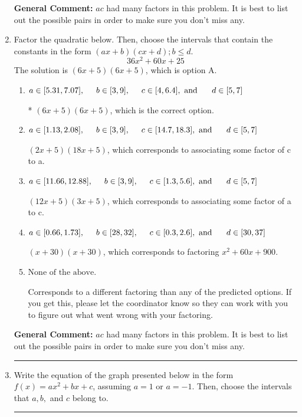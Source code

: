 \documentclass{extbook}[14pt]
\newcommand{\litem}[1]{\item #1

\rule{\textwidth}{0.4pt}}
\begin{document}
\begin{enumerate}
{\textbf{General Comment:} $ac$ had many factors in this problem. It is best to list out the possible pairs in order to make sure you don't miss any.
}
\litem{
Factor the quadratic below. Then, choose the intervals that contain the constants in the form $(ax+b)(cx+d); b \leq d.$
\[ 36x^{2} +60 x + 25 \]The solution is \( (6x + 5)(6x + 5) \), which is option A.\begin{enumerate}[label=\Alph*.]
\item \( a \in [5.31, 7.07], \hspace*{5mm} b \in [3, 9], \hspace*{5mm} c \in [4, 6.4], \text{ and } \hspace*{5mm} d \in [5, 7] \)

* $(6x + 5)(6x + 5)$, which is the correct option.
\item \( a \in [1.13, 2.08], \hspace*{5mm} b \in [3, 9], \hspace*{5mm} c \in [14.7, 18.3], \text{ and } \hspace*{5mm} d \in [5, 7] \)

 $(2x + 5)(18x + 5)$, which corresponds to associating some factor of c to a.
\item \( a \in [11.66, 12.88], \hspace*{5mm} b \in [3, 9], \hspace*{5mm} c \in [1.3, 5.6], \text{ and } \hspace*{5mm} d \in [5, 7] \)

 $(12x + 5)(3x + 5)$, which corresponds to associating some factor of a to c.
\item \( a \in [0.66, 1.73], \hspace*{5mm} b \in [28, 32], \hspace*{5mm} c \in [0.3, 2.6], \text{ and } \hspace*{5mm} d \in [30, 37] \)

 $(x + 30)(x + 30)$, which corresponds to factoring $x^{2} +60 x + 900$.
\item \( \text{None of the above.} \)

 Corresponds to a different factoring than any of the predicted options. If you get this, please let the coordinator know so they can work with you to figure out what went wrong with your factoring.
\end{enumerate}

\textbf{General Comment:} $ac$ had many factors in this problem. It is best to list out the possible pairs in order to make sure you don't miss any.
}
\litem{
Write the equation of the graph presented below in the form $f(x)=ax^2+bx+c$, assuming  $a=1$ or $a=-1$. Then, choose the intervals that $a, b,$ and $c$ belong to.

}
\end{enumerate}
\end{document}
